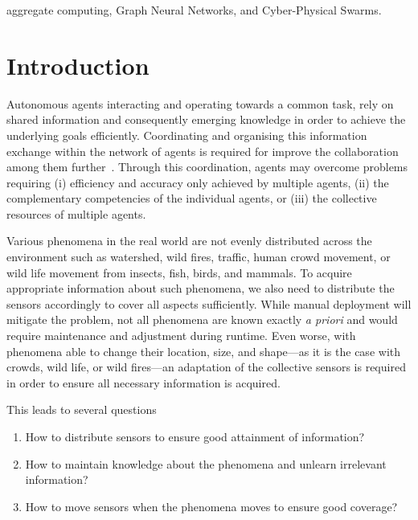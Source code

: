 \documentclass[conference]{IEEEtran}
\begin{document}
\begin{IEEEkeywords}
aggregate computing, Graph Neural Networks, and Cyber-Physical Swarms.
\end{IEEEkeywords}
%
\section{Introduction}

Autonomous agents interacting and operating towards a common task, rely on shared information and consequently emerging knowledge in order to achieve the underlying goals efficiently. 
%
Coordinating and organising this information exchange within the network of agents is required for improve the collaboration among them further~\cite{jennings1996coordination}.
%
Through this coordination, agents may overcome problems requiring (i) efficiency and accuracy only achieved by multiple agents, (ii) the complementary competencies of the individual agents, or (iii) the collective resources of multiple agents.  

Various phenomena in the real world are not evenly distributed across the environment such as watershed, wild fires, traffic, human crowd movement, or wild life movement from insects, fish, birds, and mammals.
To acquire appropriate information about such phenomena, we also need to distribute the sensors accordingly to cover all aspects sufficiently. While manual deployment will mitigate the problem, not all phenomena are known exactly \emph{a priori} and would require maintenance and adjustment during runtime. Even worse, with phenomena able to change their location, size, and shape---as it is the case with crowds, wild life, or wild fires---an adaptation of the collective sensors is required in order to ensure all necessary information is acquired. 

This leads to several questions 
\begin{enumerate}
	\item How to distribute sensors to ensure good attainment of information?
	\item How to maintain knowledge about the phenomena and unlearn irrelevant information?
	\item How to move sensors when the phenomena moves to ensure good coverage?
\end{enumerate} 
\end{document}
